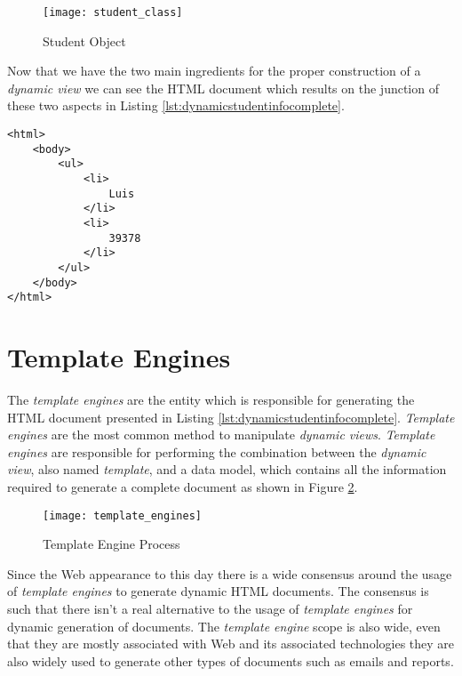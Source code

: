 \begin{figure}[H]
	\centering
	\texttt{[image: student\_class]}
	\caption{Student Object}
	\label{img:studentclass}
\end{figure}

\noindent
Now that we have the two main ingredients for the proper construction of a \textit{dynamic view} we can see the \ac{HTML} document which results on the junction of these two aspects in Listing \ref{lst:dynamicstudentinfocomplete}.

\bigskip

\lstset{language=html}

\begin{minipage}{\linewidth}
\begin{lstlisting}[caption={Dynamic Student Info}, label={lst:dynamicstudentinfocomplete}]
<html>
    <body>
        <ul>
            <li>
                Luis
            </li>
            <li>
                39378
            </li>
        </ul>
    </body>
</html>
\end{lstlisting}
\end{minipage} 

\section{Template Engines}
\label{sec:templateengines}

The \textit{template engines} are the entity which is responsible for generating the \ac{HTML} document presented in Listing \ref{lst:dynamicstudentinfocomplete}. \textit{Template engines} are the most common method to manipulate \textit{dynamic views}. \textit{Template engines} are responsible for performing the combination between the \textit{dynamic view}, also named \textit{template}, and a data model, which contains all the information required to generate a complete document as shown in Figure \ref{img:templateengineprocess}.

\begin{figure}[H]
	\centering
	\texttt{[image: template\_engines]}
	\caption{Template Engine Process}
	\label{img:templateengineprocess}
\end{figure}

\noindent
Since the Web appearance to this day there is a wide consensus around the usage of \textit{template engines} to generate dynamic \ac{HTML} documents. The consensus is such that there isn't a real alternative to the usage of \textit{template engines} for dynamic generation of documents.  The \textit{template engine} scope is also wide, even that they are mostly associated with Web and its associated technologies they are also widely used to generate other types of documents such as emails and reports. 

